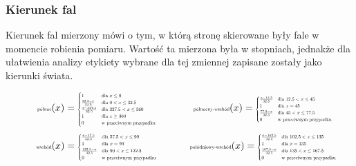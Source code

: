 \documentclass{article}
\begin{document}
\subsubsection{Kierunek fal}

\noindent Kierunek fal mierzony mówi o tym, w którą stronę skierowane były fale w momencie robienia pomiaru. Wartość ta mierzona była w stopniach, jednakże dla ułatwienia analizy etykiety wybrane dla tej zmiennej zapisane zostały jako kierunki świata.

\begin{equation*}
\begin{minipage}{0.5\textwidth}
\centering
$\text{\scalebox{0.5}{północ}}(x) =
\scalebox{0.5}{$
\begin{cases}
1 & \text{dla } x \leq 0 \\
\frac{32.5 - x}{32.5} & \text{dla } 0 < x \leq 32.5 \\
\frac{x - 327.5}{32.5} & \text{dla } 327.5 < x \leq 360 \\
1 & \text{dla } x \geq 360 \\
0 & \text{w przeciwnym przypadku}
\end{cases}
$}$
\end{minipage}%
\begin{minipage}{0.5\textwidth}
\centering
$\text{\scalebox{0.5}{północny-wschód}}(x) =
\scalebox{0.5}{$
\begin{cases}
\frac{x - 12.5}{32.5} & \text{dla } 12.5 < x \leq 45 \\
1 & \text{dla } x = 45 \\
\frac{77.5 - x}{32.5} & \text{dla } 45 < x \leq 77.5 \\
0 & \text{w przeciwnym przypadku}
\end{cases}
$}$
\end{minipage}
\end{equation*}
\begin{equation*}
\begin{minipage}{0.5\textwidth}
\centering
$\text{\scalebox{0.5}{wschód}}(x) =
\scalebox{0.5}{$
\begin{cases}
\frac{x - 57.5}{32.5} & \text{dla } 57.5 < x \leq 90 \\
1 & \text{dla } x = 90 \\
\frac{122.5 - x}{32.5} & \text{dla } 90 < x \leq 122.5 \\
0 & \text{w przeciwnym przypadku}
\end{cases}
$}$
\end{minipage}%
\begin{minipage}{0.5\textwidth}
\centering
$\text{\scalebox{0.5}{połódniowy-wschód}}(x) =
\scalebox{0.5}{$
\begin{cases}
\frac{x - 102.5}{32.5} & \text{dla } 102.5 < x \leq 135 \\
1 & \text{dla } x = 135 \\
\frac{167.5 - x}{32.5} & \text{dla } 135 < x \leq 167.5 \\
0 & \text{w przeciwnym przypadku}
\end{cases}
$}$
\end{minipage}
\end{equation*}
\end{document}
